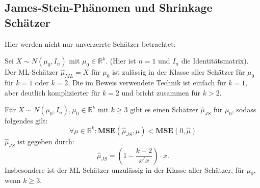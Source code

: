 \documentclass[10pt]{article}
\newcommand{\IR}{\mathbb{R}} %
\newcommand{\MSE}{\textbf{MSE}} %
\begin{document}
	\subsection{James-Stein-Phänomen und Shrinkage Schätzer}

	Hier werden nicht nur unverzerrte Schätzer betrachtet:
	
	\begin{Proposition}
		Sei $X \sim N(\mu_0, I_n)$ mit $\mu_0 \in \IR^k.$ (Hier ist $n=1$ und $I_n$ die Identitätsmatrix). Der ML-Schätzer $\hat{\mu}_{ML} = X$ für $\mu_0$ ist zulässig in der Klasse aller Schätzer für $\mu_0$ für $k=1$ oder $k=2$. Die im Beweis verwendete Technik ist einfach für $k=1$, aber deutlich komplizierter für $k=2$ und bricht zusammen für $k>2$. 
		
		Für $X \sim N(\mu_0, I_n), \mu_0 \in \IR^k$ mit $k \geq 3$ gibt es einen Schätzer $\hat{\mu}_{JS}$ für $\mu_0$, sodass folgendes gilt:
		\begin{equation*}
			\forall \mu \in \IR^k: \MSE(\hat{\mu}_{JS}, \mu) < \MSE(0,\hat{\mu})
		\end{equation*}
		$\hat{\mu}_{JS}$ ist gegeben durch:
		\begin{equation*}
			\hat{\mu}_{JS} = \left(1-\frac{k-2}{x'x}\right) \cdot x.
		\end{equation*}
		Insbesondere ist der ML-Schätzer unzulässig in der Klasse aller Schätzer, für $\mu_0$, wenn $k \geq 3$. 
	\end{Proposition}
\end{document}
